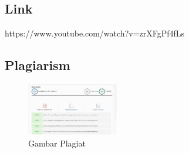\subsection{Link}
https://www.youtube.com/watch?v=zrXFgPf4fLs
\subsection{Plagiarism}
\begin{figure}[H]
	\includegraphics[width=4cm]{figures/Tugas1/1174086/plagiat.jpg}
	\centering
	\caption{Gambar Plagiat}
\end{figure}